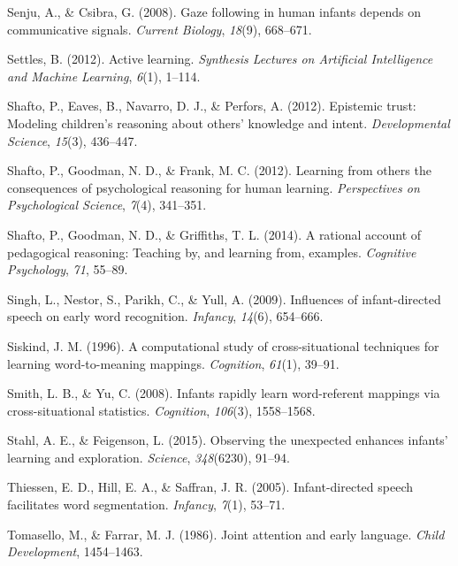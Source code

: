 \documentclass[english,man]{apa6}
\theoremstyle{definition}
\theoremstyle{definition}
\theoremstyle{definition}
\theoremstyle{remark}
\begin{document}
\hypertarget{ref-senju2008gaze}{}
Senju, A., \& Csibra, G. (2008). Gaze following in human infants depends
on communicative signals. \emph{Current Biology}, \emph{18}(9),
668--671.

\hypertarget{ref-settles2012active}{}
Settles, B. (2012). Active learning. \emph{Synthesis Lectures on
Artificial Intelligence and Machine Learning}, \emph{6}(1), 1--114.

\hypertarget{ref-shafto2012epistemic}{}
Shafto, P., Eaves, B., Navarro, D. J., \& Perfors, A. (2012). Epistemic
trust: Modeling children's reasoning about others' knowledge and intent.
\emph{Developmental Science}, \emph{15}(3), 436--447.

\hypertarget{ref-shafto2012learning}{}
Shafto, P., Goodman, N. D., \& Frank, M. C. (2012). Learning from others
the consequences of psychological reasoning for human learning.
\emph{Perspectives on Psychological Science}, \emph{7}(4), 341--351.

\hypertarget{ref-shafto2014rational}{}
Shafto, P., Goodman, N. D., \& Griffiths, T. L. (2014). A rational
account of pedagogical reasoning: Teaching by, and learning from,
examples. \emph{Cognitive Psychology}, \emph{71}, 55--89.

\hypertarget{ref-singh2009influences}{}
Singh, L., Nestor, S., Parikh, C., \& Yull, A. (2009). Influences of
infant-directed speech on early word recognition. \emph{Infancy},
\emph{14}(6), 654--666.

\hypertarget{ref-siskind1996computational}{}
Siskind, J. M. (1996). A computational study of cross-situational
techniques for learning word-to-meaning mappings. \emph{Cognition},
\emph{61}(1), 39--91.

\hypertarget{ref-smith2008infants}{}
Smith, L. B., \& Yu, C. (2008). Infants rapidly learn word-referent
mappings via cross-situational statistics. \emph{Cognition},
\emph{106}(3), 1558--1568.

\hypertarget{ref-stahl2015observing}{}
Stahl, A. E., \& Feigenson, L. (2015). Observing the unexpected enhances
infants' learning and exploration. \emph{Science}, \emph{348}(6230),
91--94.

\hypertarget{ref-thiessen2005infant}{}
Thiessen, E. D., Hill, E. A., \& Saffran, J. R. (2005). Infant-directed
speech facilitates word segmentation. \emph{Infancy}, \emph{7}(1),
53--71.

\hypertarget{ref-tomasello1986joint}{}
Tomasello, M., \& Farrar, M. J. (1986). Joint attention and early
language. \emph{Child Development}, 1454--1463.
\end{document}
